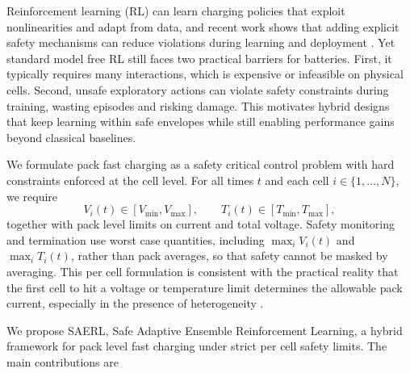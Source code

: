 \documentclass[%
 aip,
 amsmath,amssymb,
reprint, onecolumn %
]{revtex4-1}
\begin{document}
Reinforcement learning (RL) can learn charging policies that exploit nonlinearities and adapt from data, and recent work shows that adding explicit safety mechanisms can reduce violations during learning and deployment \cite{wang2023saclagrange}. Yet standard model free RL still faces two practical barriers for batteries. First, it typically requires many interactions, which is expensive or infeasible on physical cells. Second, unsafe exploratory actions can violate safety constraints during training, wasting episodes and risking damage. This motivates hybrid designs that keep learning within safe envelopes while still enabling performance gains beyond classical baselines.

We formulate pack fast charging as a safety critical control problem with hard constraints enforced at the cell level. For all times $t$ and each cell $i \in \{1,\ldots,N\}$, we require
\begin{equation}
V_i(t) \in [V_{\min}, V_{\max}],
\qquad
T_i(t) \in [T_{\min}, T_{\max}],
\label{eq_cell_safety}
\end{equation}
together with pack level limits on current and total voltage. Safety monitoring and termination use worst case quantities, including $\max_i V_i(t)$ and $\max_i T_i(t)$, rather than pack averages, so that safety cannot be masked by averaging. This per cell formulation is consistent with the practical reality that the first cell to hit a voltage or temperature limit determines the allowable pack current, especially in the presence of heterogeneity \cite{xin2024machines}.

We propose SAERL, Safe Adaptive Ensemble Reinforcement Learning, a hybrid framework for pack level fast charging under strict per cell safety limits. The main contributions are
\end{document}
